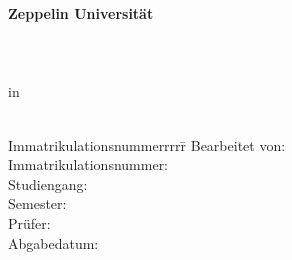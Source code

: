 \begin{centering}
\Large \textbf{Zeppelin Universität}\\
\Large \Programme \\
\vfill
\LARGE \textbf{\Title} \\
\vfill
\LARGE \AsssignmentName \\ %
\Large in \\
\LARGE  \Class \\
\vfill
\begin{small}
\begin{doublespace}
	\begin{tabbing}
	Immatrikulationsnummerrrrr\=\kill
	Bearbeitet von:\>\Name\\
	Immatrikulationsnummer:\>\MatrikelNummer\\
	Studiengang:\>\Programme\\
	Semester:\>\Semester\\
	Prüfer:\>\Supervisor\\
	Abgabedatum:\>\Date
	\end{tabbing}
\end{doublespace}
\end{small}

\end{centering}\vspace{1cm}